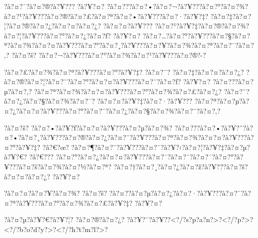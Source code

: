 \documentclass[11pt, openany]{book}
\begin{document}
{{{{{{{{{{{?à?¤?¯?à?¤?®?à?¥??? ?à?¥?¤?
?à?¤???à?¤?•?à?¤?¬?à?¥???à?¤?°?à?¤?¾?à?¤?¹?à?¥???à?¤?®?à?¤?£?à?¤?ª?à?¤?•?à?¥???à?¤?·?à?¥?‡?
?à?¤?‡?à?¤?¦?à?¤?®?à?¤?¿?à?¤?¤?à?¤?¿? ?à?¤?¤?à?¥???
?à?¤?¹?à?¥?‡?à?¤?®?à?¤?¾?à?¤?¦?à?¥???à?¤?°?à?¤?¿?à?¤?ƒ? ?à?¥?¤?
?à?¤?\ldots{}?à?¤?°?à?¥???à?¤?§?à?¤?ª?à?¤?¾?à?¤?¤?à?¥???à?¤?°?à?¤?¸?à?¥???à?¤?¥?à?¤?¾?à?¤?ª?à?¤?¨?à?¤?‚?
?à?¤?š? ?à?¤?¬?à?¥???à?¤?°?à?¤?¾?à?¤?¹?à?¥???à?¤?®?-?

?à?¤?£?à?¤?¾?à?¤?ª?à?¥???à?¤?°?à?¥?‡? ?à?¤?¨? ?à?¤?‡?à?¤?¤?à?¤?¿?
?à?¤?®?à?¤?¦?à?¤?¨?à?¤?°?à?¤?¤?à?¥???à?¤?¨?à?¤?ƒ? ?à?¥?¤?
?à?¤???à?¤?µ?à?¤?‚? ?à?¤?ª?à?¤?¾?à?¤?¤?à?¥???à?¤?°?à?¤?¾?à?¤?£?à?¤?¿?
?à?¤?¨?à?¤?¿?à?¤?§?à?¤?¾?à?¤?¯? ?à?¤?¤?à?¥?‡?à?¤?·?à?¥???
?à?¤?ª?à?¤?µ?à?¤?¿?à?¤?¤?à?¥???à?¤?°?à?¤?¨?à?¤?¿?à?¤?§?à?¤?¾?à?¤?¨?à?¤?‚?

?à?¤?š? ?à?¤?•?à?¥?ƒ?à?¤?¤?à?¥???à?¤?µ?à?¤?¾?
?à?¤???à?¤?•?à?¥?ˆ?à?¤?•?à?¤?¸?à?¥???à?¤?®?à?¤?¿?à?¤?¨?à?¥???à?¤?ª?à?¤?¾?à?¤?¤?à?¥???à?¤?°?à?¥?‡?
?â?€?œ? ?à?¤?¶?à?¤?¨?à?¥???à?¤?¨?à?¥?‹?à?¤?¦?à?¥?‡?à?¤?µ?à?¥?€? ?â?€???
?à?¤?°?à?¤?¿?à?¤?¤?à?¥???à?¤?¯?à?¤?¨?à?¤?¯?à?¤?°?à?¥???à?¤?š?à?¤?¾?à?¤?½?à?¤?ª?
?à?¤?†?à?¤?¸?à?¤?¿?à?¤?ž?à?¥???à?¤?š?à?¤?¤?à?¤?¿? ?à?¥?¤?

?à?¤?¤?à?¤?¥?à?¤?¾? ?à?¤?š?
?à?¤?­?à?¤?µ?à?¤?¿?à?¤?·?à?¥???à?¤?¯?à?¤?ª?à?¥???à?¤?°?à?¤?¾?à?¤?£?à?¥?‡?
?à?¥?¤?

?à?¤?µ?à?¥?€?à?¥?¦? ?à?¤?®?à?¤?¿?
?à?¥?¨?à?¥?­?\textless{}?/?s?p?a?n?\textgreater{}?\textless{}?/?p?\textgreater{}?\textless{}?/?b?o?d?y?\textgreater{}?\textless{}?/?h?t?m?l?\textgreater{}?

}}}}}}}}}}}
\end{document}
